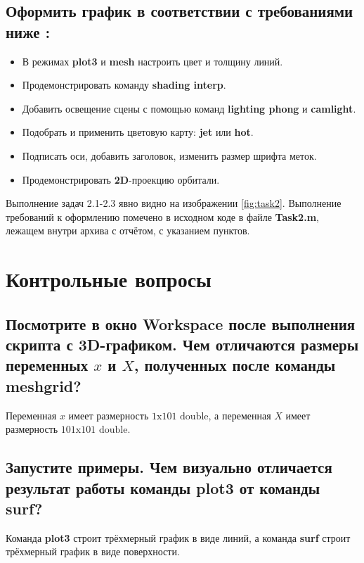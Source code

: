 \documentclass[12pt]{article}
\begin{document}
\subsection{Оформить график в соответствии с требованиями ниже :}

\begin{itemize}
\item В режимах \textbf{plot3} и \textbf{mesh} настроить цвет и толщину линий.
\item Продемонстрировать команду \textbf{shading interp}.
\item Добавить освещение сцены с помощью команд \textbf{lighting phong} и \textbf{camlight}.
\item Подобрать и применить цветовую карту: \textbf{jet} или \textbf{hot}.
\item Подписать оси, добавить заголовок, изменить размер шрифта меток.
\item Продемонстрировать \textbf{2D}-проекцию орбитали.
\end{itemize}

Выполнение задач 2.1-2.3 явно видно на изображении \ref{fig:task2}. 
Выполнение требований к оформлению помечено в исходном коде в файле \textbf{Task2.m}, лежащем внутри архива 
с отчётом, с указанием пунктов.

\section{Контрольные вопросы}

\subsection{Посмотрите в окно Workspace после выполнения скрипта с 3D-графиком. 
Чем отличаются размеры переменных $x$ и $X$, полученных после команды meshgrid?}

Переменная $x$ имеет размерность $1\text{x}101 \text{ double}$, а переменная $X$ имеет 
размерность $101\text{x}101 \text{ double}$.

\subsection{Запустите примеры. Чем визуально отличается результат работы команды \textbf{plot3} от команды \textbf{surf}?}

Команда \textbf{plot3} строит трёхмерный график в виде линий, а команда \textbf{surf} строит трёхмерный график в виде поверхности.
\end{document}
